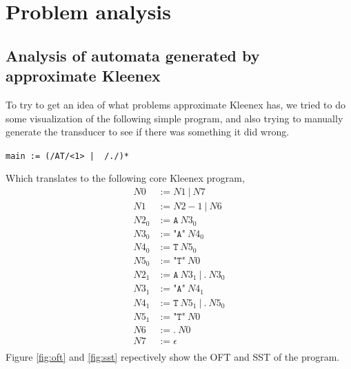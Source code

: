 \section{Problem analysis}

\subsection{Analysis of automata generated by approximate Kleenex}
To try to get an idea of what problems approximate Kleenex has, we tried to do
some visualization of the following simple program, and also
trying to manually generate the transducer to see if there was something it did
wrong.
\begin{center}
    \texttt{main := (/AT/<1> | ~/./)*}
\end{center}

Which translates to the following core Kleenex program,
\begin{align*}
    N0      &:= N1\ |\ N7\\
    N1      &:= N2-1\ |\ N6\\
    N2_0    &:= \texttt{A}\ N3_0\\
    N3_0    &:= \texttt{"A"}\ N4_0\\
    N4_0    &:= \texttt{T}\ N5_0\\
    N5_0    &:= \texttt{"T"}\ N0\\
    N2_1    &:= \texttt{A}\ N3_1\ |\ \texttt{.}\ N3_0\\
    N3_1    &:= \texttt{"A"}\ N4_1\\
    N4_1    &:= \texttt{T}\ N5_1\ |\ \texttt{.}\ N5_0\\
    N5_1    &:= \texttt{"T"}\ N0\\
    N6      &:= \texttt{.}\ N0\\
    N7      &:= \epsilon\\
\end{align*}
Figure \ref{fig:oft} and \ref{fig:sst} repectively show the OFT and SST of the
program.


